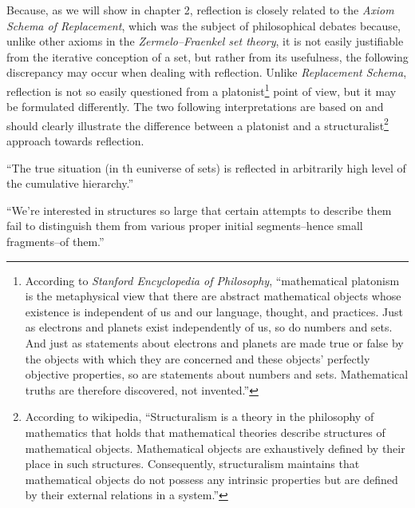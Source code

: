 Because, as we will show in chapter 2, reflection is closely related to the \emph{Axiom Schema of Replacement}, which was the subject of philosophical debates because, unlike other axioms in the \emph{Zermelo–Fraenkel set theory}, it is not easily justifiable from the iterative conception of a set, but rather from its usefulness, the following discrepancy may occur when dealing with reflection. Unlike \emph{Replacement Schema}, reflection is not so easily questioned from a platonist\footnote{According to \emph{Stanford Encyclopedia of Philosophy}, ``mathematical platonism is the metaphysical view that there are abstract mathematical objects whose existence is independent of us and our language, thought, and practices. Just as electrons and planets exist independently of us, so do numbers and sets. And just as statements about electrons and planets are made true or false by the objects with which they are concerned and these objects' perfectly objective properties, so are statements about numbers and sets. Mathematical truths are therefore discovered, not invented.''} point of view, but it may be formulated differently. The two following interpretations are based on \cite{HellmanInfinite} and should clearly illustrate the difference between a platonist and a structuralist\footnote{According to wikipedia, ``Structuralism is a theory in the philosophy of mathematics that holds that mathematical theories describe structures of mathematical objects. Mathematical objects are exhaustively defined by their place in such structures. Consequently, structuralism maintains that mathematical objects do not possess any intrinsic properties but are defined by their external relations in a system.''} approach towards reflection.
\begin{displayquote}
``The true situation (in th euniverse of sets) is reflected in arbitrarily high level of the cumulative hierarchy.''
\end{displayquote}
\begin{displayquote}
``We're interested in structures so large that certain attempts to describe them fail to distinguish them from various proper initial segments–hence small fragments–of them.''
\end{displayquote}


